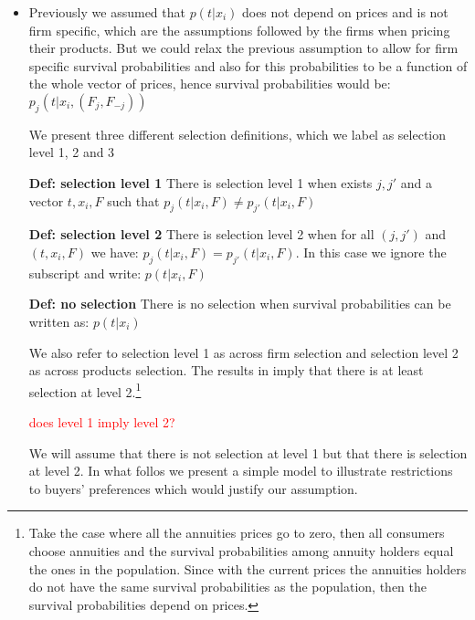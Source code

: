 \documentclass[12pt]{article}
\theoremstyle{plain}
\theoremstyle{plain}
\begin{document}
\begin{itemize}
\item Previously we assumed that $p(t|x_{i})$ does not depend on prices and is not firm specific, which are the assumptions followed by the firms when pricing their products. 
But we could relax the previous assumption to allow 
 for firm specific survival probabilities and also for this probabilities to be a function of the whole vector of prices, hence survival probabilities would be:   $p_j(t|x_{i}, (F_j, F_{-j}))$ 


We present three different selection definitions, which we label as selection level 1, 2 and 3

\textbf{Def: selection level 1} 
There is selection level 1 when exists $j,j'$ and a vector $t,x_{i},F$ such that  $p_j(t|x_{i}, F) \neq p_{j'}(t|x_{i}, F)$

\textbf{Def: selection level 2} 
There is selection level 2 when
for all $(j,j')$ and $(t,x_{i},F)$ we have: 
$p_j(t|x_{i}, F) = p_{j'}(t|x_{i}, F)$. In this case we ignore the subscript and write: $p(t|x_{i}, F)$ 

\textbf{Def: no selection} 
There is no selection  when  survival probabilities can be written as:   $p(t|x_{i})$

We also refer to selection level 1 as across firm selection and selection level 2 as across products selection. The results in \textcite{illanes_retirement_2019} imply that there is at least selection at level 2.\footnote{Take the case where all the annuities prices go to zero, then all consumers choose annuities and the survival probabilities among annuity holders equal the ones in the population. Since with the current prices the annuities holders do not have the same survival probabilities as the population, then the survival probabilities depend on prices.}


\textcolor{red}{does level 1 imply level 2? }

We will assume that there is not selection at level 1 but that there is selection at level 2. In what follos we present a simple model to illustrate restrictions to buyers' preferences which would justify our assumption. 




\end{itemize}
\end{document}
